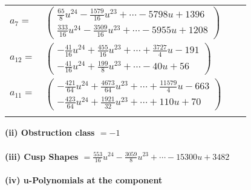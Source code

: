 \documentclass[1p]{elsarticle_modified}
\theoremstyle{definition}
\begin{document}
\begin{tabular}{m{7pt} m{180pt} m{7pt} m{180pt} }
\flushright $a_{7}=$&$\begin{pmatrix}\frac{65}{8} u^{24}-\frac{1579}{16} u^{23}+\cdots-5798 u+1396\\\frac{333}{16} u^{24}-\frac{3509}{16} u^{23}+\cdots-5955 u+1208\end{pmatrix}$ \\
\flushright $a_{12}=$&$\begin{pmatrix}-\frac{41}{16} u^{24}+\frac{455}{16} u^{23}+\cdots+\frac{3727}{4} u-191\\-\frac{41}{16} u^{24}+\frac{199}{8} u^{23}+\cdots-40 u+56\end{pmatrix}$ \\
\flushright $a_{11}=$&$\begin{pmatrix}-\frac{421}{64} u^{24}+\frac{4673}{64} u^{23}+\cdots+\frac{11579}{4} u-663\\-\frac{423}{64} u^{24}+\frac{1921}{32} u^{23}+\cdots+110 u+70\end{pmatrix}$\\&\end{tabular}
\flushleft \textbf{(ii) Obstruction class $= -1$}\\~\\
\flushleft \textbf{(iii) Cusp Shapes $= \frac{553}{16} u^{24}-\frac{3059}{8} u^{23}+\cdots-15300 u+3482$}\\~\\
\newpage\renewcommand{\arraystretch}{1}
\flushleft \textbf{(iv) u-Polynomials at the component}\newline \\
\end{document}
